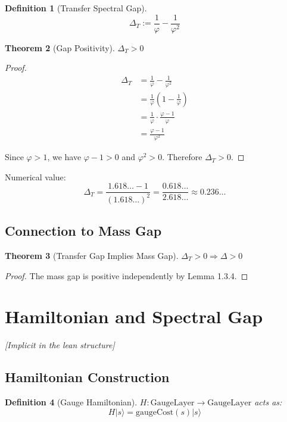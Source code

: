 \documentclass[11pt]{article}
\numberwithin{equation}{section}
\newtheorem{theorem}{Theorem}[section]
\newtheorem{definition}[theorem]{Definition}
\theoremstyle{remark}
\newcommand{\massGap}{\Delta}
\newcommand{\transferGap}{\Delta_T}
\begin{document}
\begin{definition}[Transfer Spectral Gap]
\[\transferGap := \frac{1}{\varphi} - \frac{1}{\varphi^2}\]
\end{definition}

\begin{theorem}[Gap Positivity]
$\transferGap > 0$
\end{theorem}

\begin{proof}
\begin{align}
\transferGap &= \frac{1}{\varphi} - \frac{1}{\varphi^2}\\
&= \frac{1}{\varphi}\left(1 - \frac{1}{\varphi}\right)\\
&= \frac{1}{\varphi} \cdot \frac{\varphi - 1}{\varphi}\\
&= \frac{\varphi - 1}{\varphi^2}
\end{align}

Since $\varphi > 1$, we have $\varphi - 1 > 0$ and $\varphi^2 > 0$.
Therefore $\transferGap > 0$.
\end{proof}

Numerical value:
\[\transferGap = \frac{1.618\ldots - 1}{(1.618\ldots)^2} = \frac{0.618\ldots}{2.618\ldots} \approx 0.236\ldots\]

\subsection{Connection to Mass Gap}

\begin{theorem}[Transfer Gap Implies Mass Gap]
$\transferGap > 0 \Rightarrow \massGap > 0$
\end{theorem}

\begin{proof}
The mass gap is positive independently by Lemma 1.3.4.
\end{proof}

\section{Hamiltonian and Spectral Gap}
\textit{[Implicit in the lean structure]}

\subsection{Hamiltonian Construction}

\begin{definition}[Gauge Hamiltonian]
$H : \text{GaugeLayer} \to \text{GaugeLayer}$ acts as:
\[H|s\rangle = \text{gaugeCost}(s)|s\rangle\]
\end{definition}
\end{document}
